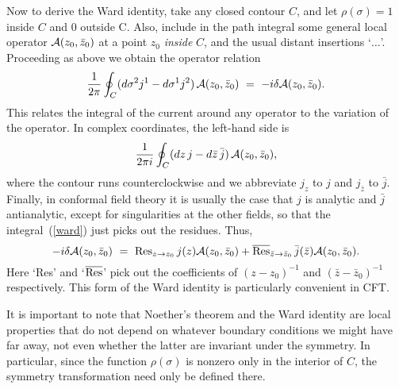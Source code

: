 Now to derive the Ward identity, take any closed contour $C$, and
let $\rho(\sigma) = 1$ inside $C$ and 0 outside C.  Also, include in
the path integral some general local operator ${\cal A}(z_0,\bar
z_0)$ at a point $z_0$ {\it inside} $C$, and the usual
distant insertions `$\ldots$'.  Proceeding as above we obtain
the operator relation
\begin{equation}
\frac{1}{2\pi}\oint_C (d\sigma^2 j^1 - d\sigma^1 j^2)\,
{\cal A}(z_0,\bar z_0)\ =\ - i
\delta {\cal A}(z_0,\bar z_0).
\end{equation}
This relates the
integral of the current around any operator to the variation of the
operator.  In complex coordinates, the left-hand side is
\begin{equation}
\frac{1}{2\pi i} \oint_C (dz\, j - d\bar z \, \bar j) \,
{\cal A}(z_0,\bar z_0), \label{ward}
\end{equation}
where the contour runs counterclockwise and we abbreviate $j_z$ to
$j$ and $j_{\bar z}$ to $\bar j$.
Finally, in conformal
field theory it is usually the case that $j$ is analytic
and $\bar j$ antianalytic, except for singularities at the
other fields, so that the integral~(\ref{ward}) just picks out the
residues.  Thus,
\begin{equation}
- i \delta {\cal A}(z_0,\bar z_0)\ =\ {\rm Res}_{z \to z_0}\, j(z)
{\cal A}(z_0,\bar z_0) + {\rm \overline{Res}}_{\bar z \to \bar
z_0}\,
\bar j(\bar z) {\cal A}(z_0,\bar z_0). \label{wardres}
\end{equation}
Here `Res' and `$\overline{\rm Res}$' pick out the coefficients
of $(z - z_0)^{-1}$ and $(\bar z - \bar z_0)^{-1}$ respectively.
This form of the Ward identity is particularly convenient in CFT.

It is important to note that Noether's theorem and
the Ward identity are local properties that do not depend on
whatever boundary conditions we might have far away, not even whether
the latter are invariant under the symmetry.  In particular, since
the function $\rho(\sigma)$ is nonzero only in the interior of $C$,
the symmetry transformation need only be defined there.


